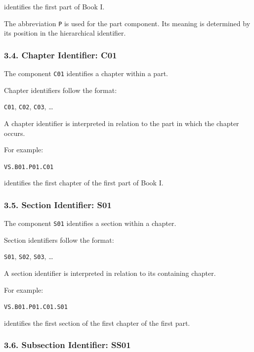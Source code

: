 identifies the first part of Book I.

The abbreviation \texttt{P} is used
for the part component. Its meaning
is determined by its position in the
hierarchical identifier.

\subsubsection*{3.4. Chapter Identifier: C01}

The component \texttt{C01} identifies
a chapter within a part.

Chapter identifiers follow the format:

\begin{center}
    \texttt{C01}, \texttt{C02},
    \texttt{C03}, \ldots
\end{center}

A chapter identifier is interpreted
in relation to the part in which
the chapter occurs.

For example:

\begin{center}
    \texttt{VS.B01.P01.C01}
\end{center}

identifies the first chapter of the
first part of Book I.

\subsubsection*{3.5. Section Identifier: S01}

The component \texttt{S01} identifies
a section within a chapter.

Section identifiers follow the format:

\begin{center}
    \texttt{S01}, \texttt{S02},
    \texttt{S03}, \ldots
\end{center}

A section identifier is interpreted
in relation to its containing chapter.

For example:

\begin{center}
    \texttt{VS.B01.P01.C01.S01}
\end{center}

identifies the first section of the
first chapter of the first part.

\subsubsection*{3.6. Subsection Identifier: SS01}

